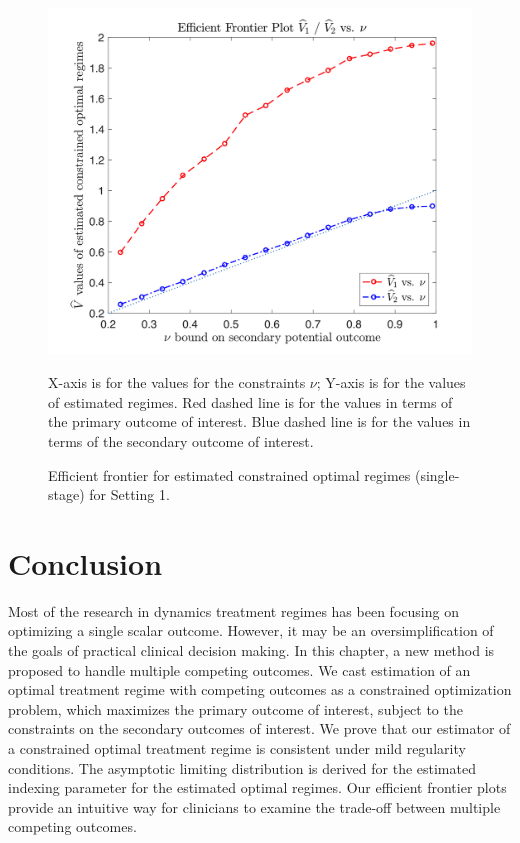 \begin{figure}[!htbp]
	\centering
	\includegraphics[width=.9\linewidth]{./Chapter-1/figs/efficient_plot1.png}
	\caption{Efficient frontier for estimated constrained optimal regimes (single-stage) for Setting 1.}
	\label{fig:1}
\justify
X-axis is for the values for the constraints $\nu$; Y-axis is for the values of estimated regimes. Red dashed line is for the values in terms of the primary outcome of interest. Blue dashed line is for the values in terms of the secondary outcome of interest.
\end{figure}


\section{Conclusion}
Most of the research in dynamics treatment regimes has been focusing on optimizing a single scalar outcome. However, it may be an oversimplification of the goals of practical clinical decision making. In this chapter, a new method is proposed to handle multiple competing outcomes. We cast estimation of an optimal treatment regime with competing outcomes as a constrained optimization problem, which maximizes the primary outcome of interest, subject to the constraints on the secondary outcomes of interest. We prove that our estimator of a constrained optimal treatment regime is consistent under mild regularity conditions. The asymptotic limiting distribution is derived for the estimated indexing parameter for the estimated optimal regimes. Our efficient frontier plots provide an intuitive way for clinicians to examine the trade-off between multiple competing outcomes. 



		
